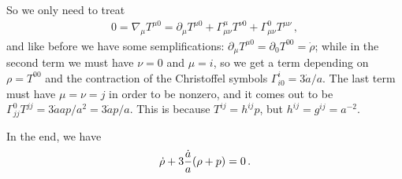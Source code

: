 \documentclass[main.tex]{subfiles}
\begin{document}
So we only need to treat 
%
\begin{align}
0=\nabla_{\mu } T^{\mu 0 }
= \partial_{\mu } T^{\mu 0} 
+ \Gamma^{\mu }_{\mu \nu } T^{\nu 0}
+ \Gamma^{0}_{\mu \nu } T^{\mu \nu }
\,,
\end{align}
%
and like before we have some semplifications: \(\partial_{\mu } T^{\mu 0} = \partial_{0} T^{00} = \dot{\rho}\); while in the second term we must have \(\nu = 0\) and \(\mu =i\), so we get a term depending on \(\rho = T^{00}\) and the contraction of the Christoffel symbols \(\Gamma^{i}_{i0} = 3 \dot{a} / a\). The last term must have \(\mu = \nu = j\) in order to be nonzero, and it comes out to be \(\Gamma^{0}_{jj} T^{jj} = 3 \dot{a} a p/ a^2 = 3 \dot{a} p / a\).
This is because \(T^{ij} = h^{ij} p\), but \(h^{ij} = g^{ij} = a^{-2}\). 

In the end, we have 
%
\begin{align}
\dot{\rho} + 3 \frac{\dot{a}}{a}\qty( \rho + p ) = 0 
\,.
\end{align}
%
\end{document}
